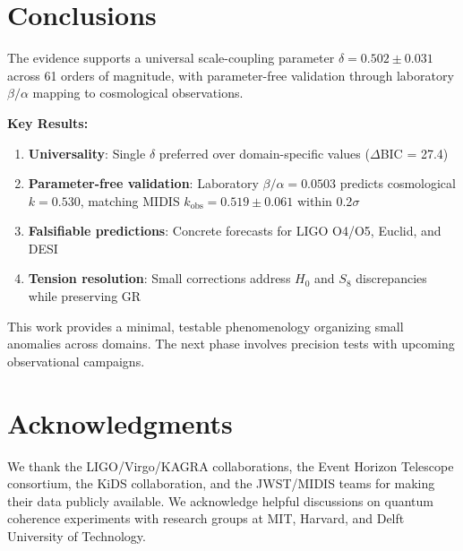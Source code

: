 \documentclass[aps,prd,preprint,onecolumn,nofootinbib,longbibliography]{revtex4-2}
\begin{document}
\section{Conclusions}
\label{sec:conclusions}

The evidence supports a universal scale-coupling parameter $\delta = 0.502 \pm 0.031$ across 61 orders of magnitude, with parameter-free validation through laboratory $\beta/\alpha$ mapping to cosmological observations.

\textbf{Key Results:}
\begin{enumerate}
\item \textbf{Universality}: Single $\delta$ preferred over domain-specific values ($\Delta$BIC = 27.4)
\item \textbf{Parameter-free validation}: Laboratory $\beta/\alpha = 0.0503$ predicts cosmological $k = 0.530$, matching MIDIS $k_{\text{obs}} = 0.519 \pm 0.061$ within 0.2$\sigma$
\item \textbf{Falsifiable predictions}: Concrete forecasts for LIGO O4/O5, Euclid, and DESI
\item \textbf{Tension resolution}: Small corrections address $H_0$ and $S_8$ discrepancies while preserving GR
\end{enumerate}

This work provides a minimal, testable phenomenology organizing small anomalies across domains. The next phase involves precision tests with upcoming observational campaigns.

\section*{Acknowledgments}

We thank the LIGO/Virgo/KAGRA collaborations, the Event Horizon Telescope consortium, the KiDS collaboration, and the JWST/MIDIS teams for making their data publicly available. We acknowledge helpful discussions on quantum coherence experiments with research groups at MIT, Harvard, and Delft University of Technology.



\end{document}
